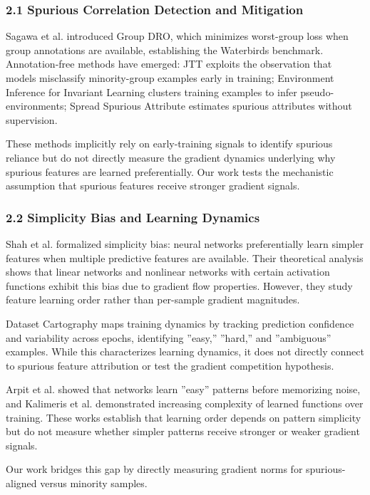 
\subsubsection{2.1 Spurious Correlation Detection and Mitigation}

Sagawa et al. introduced Group DRO, which minimizes worst-group loss when group annotations are available, establishing the Waterbirds benchmark. Annotation-free methods have emerged: JTT exploits the observation that models misclassify minority-group examples early in training; Environment Inference for Invariant Learning clusters training examples to infer pseudo-environments; Spread Spurious Attribute estimates spurious attributes without supervision.

These methods implicitly rely on early-training signals to identify spurious reliance but do not directly measure the gradient dynamics underlying why spurious features are learned preferentially. Our work tests the mechanistic assumption that spurious features receive stronger gradient signals.

\subsubsection{2.2 Simplicity Bias and Learning Dynamics}

Shah et al. formalized simplicity bias: neural networks preferentially learn simpler features when multiple predictive features are available. Their theoretical analysis shows that linear networks and nonlinear networks with certain activation functions exhibit this bias due to gradient flow properties. However, they study feature learning order rather than per-sample gradient magnitudes.

Dataset Cartography maps training dynamics by tracking prediction confidence and variability across epochs, identifying ''easy,'' ''hard,'' and ''ambiguous'' examples. While this characterizes learning dynamics, it does not directly connect to spurious feature attribution or test the gradient competition hypothesis.

Arpit et al. showed that networks learn ''easy'' patterns before memorizing noise, and Kalimeris et al. demonstrated increasing complexity of learned functions over training. These works establish that learning order depends on pattern simplicity but do not measure whether simpler patterns receive stronger or weaker gradient signals.

Our work bridges this gap by directly measuring gradient norms for spurious-aligned versus minority samples.

